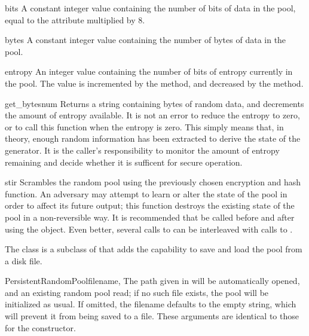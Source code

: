 \documentclass{howto}
\begin{document}
\begin{memberdesc}{bits}
A constant integer value containing the number of bits of data in
the pool, equal to the  attribute multiplied by 8.
\end{memberdesc}

\begin{memberdesc}{bytes}
A constant integer value containing the number of bytes of data in
the pool.
\end{memberdesc}

\begin{memberdesc}{entropy}
An integer value containing the number of bits of entropy currently in
the pool.  The value is incremented by the  method,
and decreased by the  method.
\end{memberdesc}

\begin{methoddesc}{get_bytes}{num}
Returns a string containing  bytes of random data, and
decrements the amount of entropy available.  It is not an error to
reduce the entropy to zero, or to call this function when the entropy
is zero.  This simply means that, in theory, enough random information has been
extracted to derive the state of the generator.  It is the caller's
responsibility to monitor the amount of entropy remaining and decide
whether it is sufficent for secure operation.
\end{methoddesc}

\begin{methoddesc}{stir}{}
Scrambles the random pool using the previously chosen encryption and
hash function.  An adversary may attempt to learn or alter the state
of the pool in order to affect its future output; this function
destroys the existing state of the pool in a non-reversible way.  It
is recommended that  be called before and after using
the  object.  Even better, several calls to
 can be interleaved with calls to .
\end{methoddesc}

The  class is a subclass of  
that adds the capability to save and load the pool from a disk file.

\begin{classdesc}{PersistentRandomPool}{filename, }
The path given in  will be automatically opened, and an
existing random pool read; if no such file exists, the pool will be
initialized as usual.  If omitted, the filename defaults to the empty
string, which will prevent it from being saved to a file.  These
arguments are identical to those for the 
constructor.
\end{classdesc}
\end{document}
